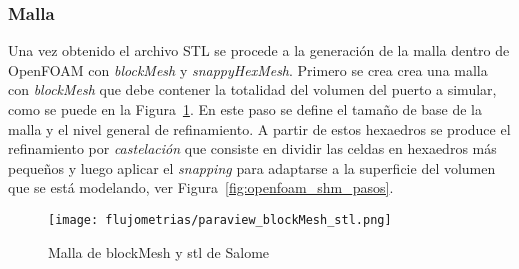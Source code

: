 
\subsubsection{Malla}\label{sec:cap3_of_malla}
%
Una vez obtenido el archivo STL se procede a la generación de la malla dentro de
OpenFOAM con \emph{blockMesh} y \emph{snappyHexMesh}.
%
Primero se crea crea una malla con \emph{blockMesh} que  debe contener la
totalidad del volumen del puerto a simular, como se puede en la
Figura~\ref{fig:paraview_blockMesh_stl}.
%
En este paso se define el tamaño de base de la malla y el nivel general de
refinamiento.
%
A partir de estos hexaedros se produce el refinamiento por \emph{castelación}
que consiste en dividir las celdas en hexaedros más pequeños y luego aplicar el
\emph{snapping} para adaptarse a la superficie del volumen que se está
modelando, ver Figura~\ref{fig:openfoam_shm_pasos}.
%

\begin{figure}
    \centering
    \texttt{[image: flujometrias/paraview\_blockMesh\_stl.png]}
    \caption{Malla de blockMesh y stl de Salome}\label{fig:paraview_blockMesh_stl}
\end{figure}

